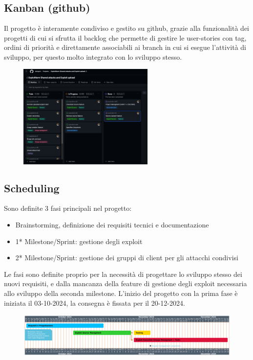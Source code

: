 \documentclass[11pt]{article}
\begin{document}
\subsection{Kanban (github)}
Il progetto è interamente condiviso e gestito su github, grazie alla funzionalità dei progetti di cui si sfrutta il backlog che permette di gestire le user-stories con tag, ordini di priorità e direttamente associabili ai branch in cui si esegue l'attività di sviluppo, per questo molto integrato con lo sviluppo stesso.
	\begin{figure}[H]
    	\centering
    	\includegraphics[width=0.6\textwidth]{backlog.png}
	\end{figure}
\subsection{Scheduling}
Sono definite 3 fasi principali nel progetto:
\begin{itemize}
    \item Brainstorming, definizione dei requisiti tecnici e documentazione
    \item 1* Milestone/Sprint: gestione degli exploit
    \item 2* Milestone/Sprint: gestione dei gruppi di client per gli attacchi condivisi
\end{itemize}
Le fasi sono definite proprio per la necessità di progettare lo sviluppo stesso dei nuovi requisiti, e dalla mancanza della feature di gestione degli exploit necessaria allo sviluppo della seconda milestone.
L'inizio del progetto con la prima fase è iniziata il 03-10-2024, la consegna è fissata per il 20-12-2024.
	\begin{figure}[H]
		\centering
    	\includegraphics[width=1\textwidth]{scheduling.png}
	\end{figure}
\end{document}
